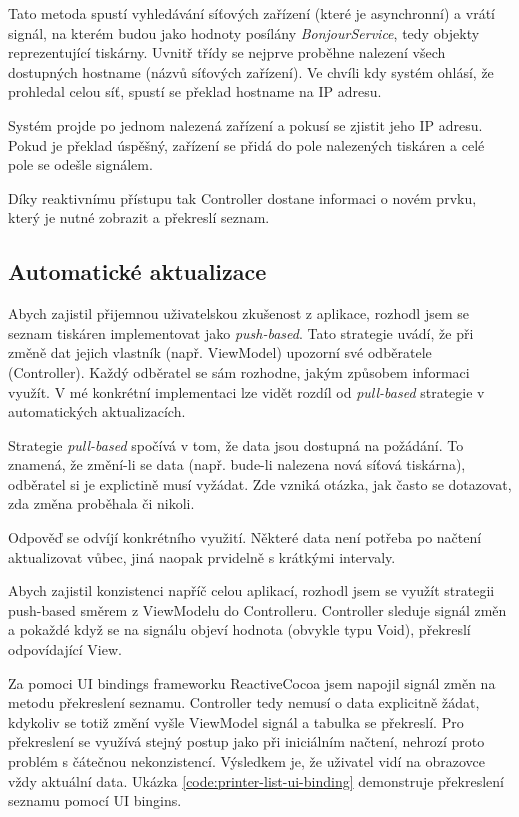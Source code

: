 Tato metoda spustí vyhledávání síťových zařízení (které je asynchronní) a vrátí signál, na kterém budou jako hodnoty posílány \textit{BonjourService}, tedy objekty reprezentující tiskárny.
Uvnitř třídy se nejprve proběhne nalezení všech dostupných hostname (názvů síťových zařízení).
Ve chvíli kdy systém ohlásí, že prohledal celou síť, spustí se překlad hostname na IP adresu.

Systém projde po jednom nalezená zařízení a pokusí se zjistit jeho IP adresu.
Pokud je překlad úspěšný, zařízení se přidá do pole nalezených tiskáren a celé pole se odešle signálem.

Díky reaktivnímu přístupu tak Controller dostane informaci o novém prvku, který je nutné zobrazit a překreslí seznam.

\subsection{Automatické aktualizace}

Abych zajistil přijemnou uživatelskou zkušenost z aplikace, rozhodl jsem se seznam tiskáren implementovat jako \textit{push-based}.
Tato strategie uvádí, že při změně dat jejich vlastník (např. ViewModel) upozorní své odběratele (Controller).
Každý odběratel se sám rozhodne, jakým způsobem informaci využít.
V mé konkrétní implementaci lze vidět rozdíl od \textit{pull-based} strategie v automatických aktualizacích.

Strategie \textit{pull-based} spočívá v tom, že data jsou dostupná na požádání.
To znamená, že změní-li se data (např. bude-li nalezena nová síťová tiskárna), odběratel si je explictině musí vyžádat.
Zde vzniká otázka, jak často se dotazovat, zda změna proběhala či nikoli.

Odpověď se odvíjí konkrétního využití.
Některé data není potřeba po načtení aktualizovat vůbec, jiná naopak prvidelně s krátkými intervaly.

\bigskip

Abych zajistil konzistenci napříč celou aplikací, rozhodl jsem se využít strategii push-based směrem z ViewModelu do Controlleru.
Controller sleduje signál změn a pokaždé když se na signálu objeví hodnota (obvykle typu Void), překreslí odpovídající View.

Za pomoci UI bindings frameworku ReactiveCocoa jsem napojil signál změn na metodu překreslení seznamu.
Controller tedy nemusí o data explicitně žádat, kdykoliv se totiž změní vyšle ViewModel signál a tabulka se překreslí.
Pro překreslení se využívá stejný postup jako při iniciálním načtení, nehrozí proto problém s čátečnou nekonzistencí.
Výsledkem je, že uživatel vidí na obrazovce vždy aktuální data.
Ukázka \ref{code:printer-list-ui-binding} demonstruje překreslení seznamu pomocí UI bingins.

